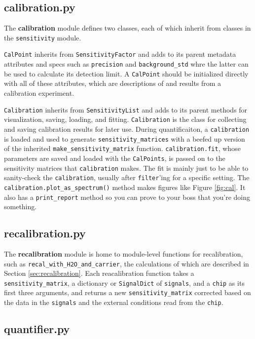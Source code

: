 \documentclass{article}
\newcommand{\code}[1]{\colorbox{codegray}{\lstinline{#1}}}
\begin{document}
\subsection{calibration.py}\label{sec:cal}

The \textbf{calibration} module defines two classes, each of which inherit from classes in the \code{sensitivity} module. 

\code{CalPoint} inherits from \code{SensitivityFactor} and adds to its parent metadata attributes and specs such as \code{precision} and \code{background_std} whre the latter can be used to calculate its detection limit. A \code{CalPoint} should be initialized directly with all of these attributes, which are descriptions of and results from a calibration experiment.

\code{Calibration} inherits from \code{SensitivityList} and adds to its parent methods for visualization, saving, loading, and fitting. \code{Calibration} is the class for collecting and saving calibration results for later use. During quantificaiton, a \code{calibration} is loaded and used to generate \code{sensitivity_matrices} with a beefed up version of the inherited \code{make_sensitivity_matrix} function. \code{calibration.fit}, whose parameters are saved and loaded with the \code{CalPoints}, is passed on to the sensitivity matrices that \code{calibration} makes. The fit is mainly just to be able to sanity-check the \code{calibration}, usually after \code{filter}'ing for a specific setting. The \code{calibration.plot_as_spectrum()} method makes figures like Figure \ref{fig:cal}. It also has a \code{print_report} method so you can prove to your boss that you're doing something.

\subsection{recalibration.py}\label{sec:recal}

The \textbf{recalibration} module is home to module-level functions for recalibration, such as \code{recal_with_H2O_and_carrier}, the calculations of which are described in Section \ref{sec:recalibration}. Each reacalibration function takes a \code{sensitivity_matrix}, a dictionary or \code{SignalDict} of \code{signals}, and a \code{chip} as its first three arguments, and returns a new \code{sensitivity_matrix} corrected based on the data in the \code{signals} and the external conditions read from the \code{chip}.

\subsection{quantifier.py}\label{sec:quantifier}
\end{document}
